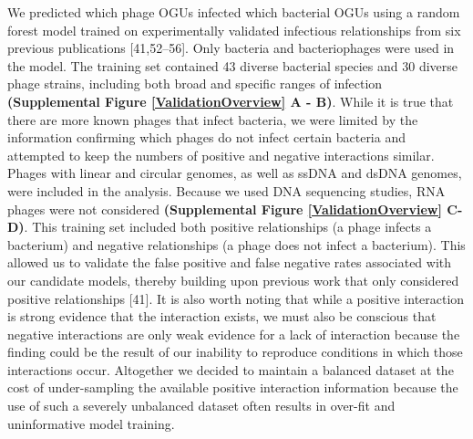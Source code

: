 \documentclass[12pt,]{article}
\begin{document}
We predicted which phage OGUs infected which bacterial OGUs using a
random forest model trained on experimentally validated infectious
relationships from six previous publications {[}41,52--56{]}. Only
bacteria and bacteriophages were used in the model. The training set
contained 43 diverse bacterial species and 30 diverse phage strains,
including both broad and specific ranges of infection
\textbf{(Supplemental Figure \ref{ValidationOverview} A - B)}. While it
is true that there are more known phages that infect bacteria, we were
limited by the information confirming which phages do not infect certain
bacteria and attempted to keep the numbers of positive and negative
interactions similar. Phages with linear and circular genomes, as well
as ssDNA and dsDNA genomes, were included in the analysis. Because we
used DNA sequencing studies, RNA phages were not considered
\textbf{(Supplemental Figure \ref{ValidationOverview} C-D)}. This
training set included both positive relationships (a phage infects a
bacterium) and negative relationships (a phage does not infect a
bacterium). This allowed us to validate the false positive and false
negative rates associated with our candidate models, thereby building
upon previous work that only considered positive relationships {[}41{]}.
It is also worth noting that while a positive interaction is strong
evidence that the interaction exists, we must also be conscious that
negative interactions are only weak evidence for a lack of interaction
because the finding could be the result of our inability to reproduce
conditions in which those interactions occur. Altogether we decided to
maintain a balanced dataset at the cost of under-sampling the available
positive interaction information because the use of such a severely
unbalanced dataset often results in over-fit and uninformative model
training.
\end{document}

